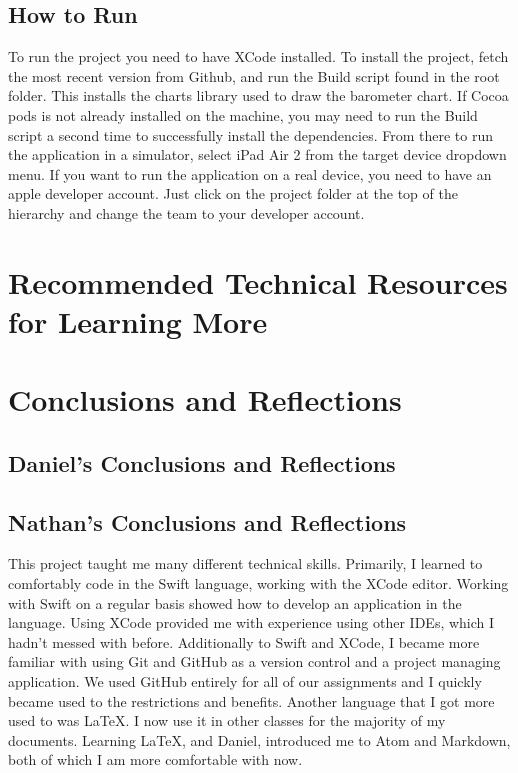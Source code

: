 \documentclass[onecolumn, draftclsnofoot,10pt, compsoc]{IEEEtran}
\begin{document}
\subsection{How to Run}
To run the project you need to have XCode installed.
To install the project, fetch the most recent version from Github, and run the Build script found in the root folder.
This installs the charts library used to draw the barometer chart.
If Cocoa pods is not already installed on the machine, you may need to run the Build script a second time to successfully install the dependencies.
From there to run the application in a simulator, select iPad Air 2 from the target device dropdown menu.
If you want to run the application on a real device, you need to have an apple developer account.
Just click on the project folder at the top of the hierarchy and change the team to your developer account.

\section{Recommended Technical Resources for Learning More}

\section{Conclusions and Reflections}

\subsection{Daniel's Conclusions and Reflections}

\subsection{Nathan's Conclusions and Reflections}
This project taught me many different technical skills.
Primarily, I learned to comfortably code in the Swift language, working with the XCode editor.
Working with Swift on a regular basis showed how to develop an application in the language.
Using XCode provided me with experience using other IDEs, which I hadn't messed with before.
Additionally to Swift and XCode, I became more familiar with using Git and GitHub as a version control and a project managing application.
We used GitHub entirely for all of our assignments and I quickly became used to the restrictions and benefits.
Another language that I got more used to was \LaTeX.
I now use it in other classes for the majority of my documents.
Learning \LaTeX, and Daniel, introduced me to Atom and Markdown, both of which I am more comfortable with now.
\end{document}
